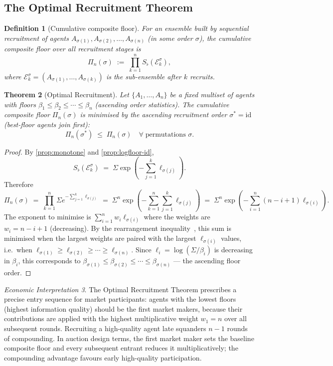 \documentclass[twocolumn,11pt,a4paper]{article}
\newtheorem{theorem}{Theorem}[section]
\newtheorem{definition}[theorem]{Definition}
\theoremstyle{remark}
\newtheorem{econinterp}[theorem]{Economic Interpretation}
\newcommand{\Sflat}{S_{\flat}}
\newcommand{\Ens}{\mathcal{E}}
\newcommand{\logfl}{\ell}                 %
\begin{document}
\subsection{The Optimal Recruitment Theorem}
\label{sec:rate:recruit}

\begin{definition}[Cumulative composite floor]
\label{def:cumul}
For an ensemble built by sequential recruitment of agents
$A_{\sigma(1)}, A_{\sigma(2)}, \ldots, A_{\sigma(n)}$ (in some order
$\sigma$), the \emph{cumulative composite floor} over all recruitment stages
is
\[
  \Pi_n(\sigma) \;:=\; \prod_{k=1}^n \Sflat(\Ens_k^\sigma),
\]
where $\Ens_k^\sigma = (A_{\sigma(1)},\ldots,A_{\sigma(k)})$ is the
sub-ensemble after $k$ recruits.
\end{definition}

\begin{theorem}[Optimal Recruitment]
\label{thm:recruitment}
Let $\{A_1,\ldots,A_n\}$ be a fixed multiset of agents with floors
$\beta_1 \le \beta_2 \le \cdots \le \beta_n$ (ascending order statistics).
The cumulative composite floor $\Pi_n(\sigma)$ is minimised by the ascending
recruitment order $\sigma^* = \mathrm{id}$ (best-floor agents join first):
\[
  \Pi_n(\sigma^*) \;\le\; \Pi_n(\sigma) \quad \forall\; \text{permutations }
  \sigma.
\]
\end{theorem}
\begin{proof}
By \cref{prop:monotone} and \cref{prop:logfloor-id},
\[
  \Sflat(\Ens_k^\sigma) \;=\; \Sigma \exp\!\left(-\sum_{j=1}^k
  \logfl_{\sigma(j)}\right).
\]
Therefore
\[
  \Pi_n(\sigma) \;=\; \prod_{k=1}^n \Sigma e^{-\sum_{j=1}^k \logfl_{\sigma(j)}}
  \;=\; \Sigma^n \exp\!\left(-\sum_{k=1}^n \sum_{j=1}^k \logfl_{\sigma(j)}\right)
  \;=\; \Sigma^n \exp\!\left(-\sum_{i=1}^n (n-i+1)\logfl_{\sigma(i)}\right).
\]
The exponent to minimise is $\sum_{i=1}^n w_i \logfl_{\sigma(i)}$ where the
weights are $w_i = n - i + 1$ (decreasing).  By the rearrangement
inequality~\cite{hlp1952}, this sum is minimised when the largest weights are
paired with the largest $\logfl_{\sigma(i)}$ values, i.e.\ when
$\logfl_{\sigma(1)} \ge \logfl_{\sigma(2)} \ge \cdots \ge \logfl_{\sigma(n)}$.
Since $\logfl_i = \log(\Sigma/\beta_i)$ is decreasing in $\beta_i$, this
corresponds to $\beta_{\sigma(1)} \le \beta_{\sigma(2)} \le \cdots \le
\beta_{\sigma(n)}$ — the ascending floor order.
\end{proof}

\begin{econinterp}
\label{ei:recruitment}
The Optimal Recruitment Theorem prescribes a precise entry sequence for
market participants: agents with the lowest floors (highest information
quality) should be the first market makers, because their contributions are
applied with the highest multiplicative weight $w_1 = n$ over all subsequent
rounds.  Recruiting a high-quality agent late squanders $n-1$ rounds of
compounding.  In auction design terms, the first market maker sets the
baseline composite floor and every subsequent entrant reduces it
multiplicatively; the compounding advantage favours early high-quality
participation.
\end{econinterp}
\end{document}
